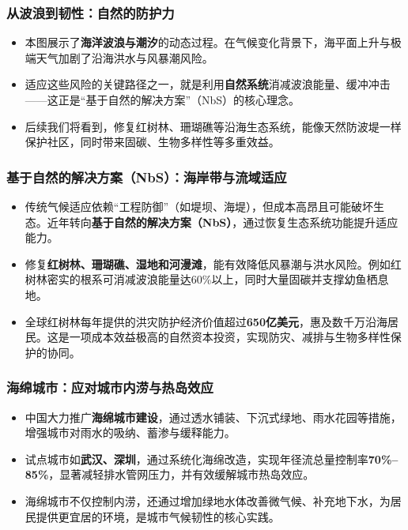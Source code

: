 \documentclass[11pt]{beamer}
\begin{document}
\begin{frame}
\frametitle{从波浪到韧性：自然的防护力}
\begin{itemize}
    \item 本图展示了\textbf{海洋波浪与潮汐}的动态过程。在气候变化背景下，海平面上升与极端天气加剧了沿海洪水与风暴潮风险。
    \item 适应这些风险的关键路径之一，就是利用\textbf{自然系统}消减波浪能量、缓冲冲击——这正是“基于自然的解决方案”（NbS）的核心理念。
    \item 后续我们将看到，修复红树林、珊瑚礁等沿海生态系统，能像天然防波堤一样保护社区，同时带来固碳、生物多样性等多重效益。
\end{itemize}
\end{frame}

\begin{frame}
\frametitle{基于自然的解决方案（NbS）：海岸带与流域适应}
\begin{itemize}
    \item 传统气候适应依赖“工程防御”（如堤坝、海堤），但成本高昂且可能破坏生态。近年转向\textbf{基于自然的解决方案（NbS）}，通过恢复生态系统功能提升适应能力。
    \item 修复\textbf{红树林、珊瑚礁、湿地和河漫滩}，能有效降低风暴潮与洪水风险。例如红树林密实的根系可消减波浪能量达60\%以上，同时大量固碳并支撑幼鱼栖息地。
    \item 全球红树林每年提供的洪灾防护经济价值超过\textbf{650亿美元}，惠及数千万沿海居民。这是一项成本效益极高的自然资本投资，实现防灾、减排与生物多样性保护的协同。
\end{itemize}
\end{frame}

\begin{frame}
\frametitle{海绵城市：应对城市内涝与热岛效应}
\begin{itemize}
    \item 中国大力推广\textbf{海绵城市建设}，通过透水铺装、下沉式绿地、雨水花园等措施，增强城市对雨水的吸纳、蓄渗与缓释能力。
    \item 试点城市如\textbf{武汉、深圳}，通过系统化海绵改造，实现年径流总量控制率\textbf{70\%--85\%}，显著减轻排水管网压力，并有效缓解城市热岛效应。
    \item 海绵城市不仅控制内涝，还通过增加绿地水体改善微气候、补充地下水，为居民提供更宜居的环境，是城市气候韧性的核心实践。
\end{itemize}
\end{frame}
\end{document}
